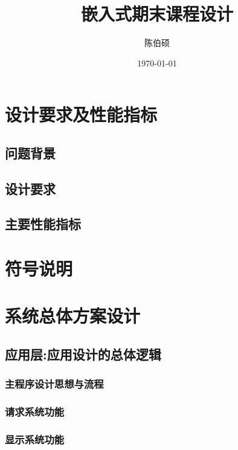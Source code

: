 \documentclass[pdfCover]{myreport} %
\title{嵌入式期末课程设计}
\author{陈伯硕}
\date{\today}
\begin{document}
\maketitle

\tableofcontents
\newpage

\section{设计要求及性能指标}
  \subsection{问题背景}
    
  \subsection{设计要求}
    
  \subsection{主要性能指标}
    

\section{符号说明}
  

\section{系统总体方案设计}
  \subsection{应用层:应用设计的总体逻辑}
    \subsubsection{主程序设计思想与流程}
      
    \subsubsection{请求系统功能}
      
    \subsubsection{显示系统功能}
      

\end{document}
